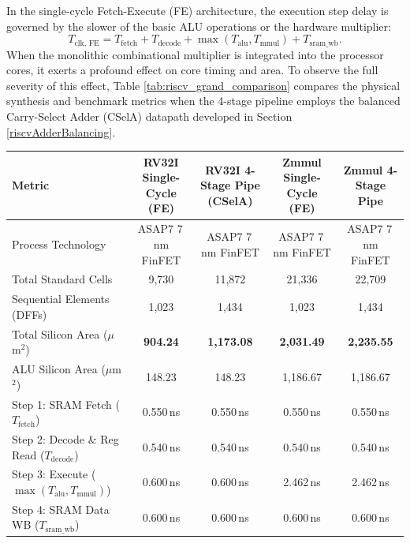 In the single-cycle Fetch-Execute (FE) architecture, the execution step delay is governed by the slower of the basic ALU operations or the hardware multiplier:
\begin{equation}
T_{\text{clk, FE}} = T_{\text{fetch}} + T_{\text{decode}} + \max(T_{\text{alu}}, T_{\text{mmul}}) + T_{\text{sram\_wb}}.
\end{equation}
When the monolithic combinational multiplier is integrated into the processor cores, it exerts a profound effect on core timing and area. To observe the full severity of this effect, Table \ref{tab:riscv_grand_comparison} compares the physical synthesis and benchmark metrics when the 4-stage pipeline employs the balanced Carry-Select Adder (CSelA) datapath developed in Section \ref{riscvAdderBalancing}.

\begin{table}[htbp]
\centering
\scriptsize
\begin{tabular}{|l|c|c|c|c|}
\hline
\textbf{Metric} & \textbf{RV32I Single-Cycle (FE)} & \textbf{RV32I 4-Stage Pipe (CSelA)} & \textbf{Zmmul Single-Cycle (FE)} & \textbf{Zmmul 4-Stage Pipe} \\
\hline
Process Technology              & ASAP7 7\,nm FinFET & ASAP7 7\,nm FinFET & ASAP7 7\,nm FinFET & ASAP7 7\,nm FinFET \\
Total Standard Cells            & 9,730            & 11,872           & 21,336           & 22,709 \\
Sequential Elements (DFFs)      & 1,023            & 1,434            & 1,023            & 1,434 \\
Total Silicon Area ($\mu$m$^2$) & \textbf{904.24}  & \textbf{1,173.08} & \textbf{2,031.49} & \textbf{2,235.55} \\
ALU Silicon Area ($\mu$m$^2$)   & 148.23           & 148.23           & 1,186.67         & 1,186.67 \\
\hline
Step 1: SRAM Fetch ($T_{\text{fetch}}$)         & 0.550\,ns          & 0.550\,ns         & 0.550\,ns          & 0.550\,ns \\
Step 2: Decode \& Reg Read ($T_{\text{decode}}$) & 0.540\,ns         & 0.540\,ns         & 0.540\,ns          & 0.540\,ns \\
Step 3: Execute ($\max(T_{\text{alu}}, T_{\text{mmul}})$) & 0.600\,ns & 0.600\,ns         & 2.462\,ns          & 2.462\,ns \\
Step 4: SRAM Data WB ($T_{\text{sram\_wb}}$)    & 0.600\,ns          & 0.600\,ns         & 0.600\,ns          & 0.600\,ns \\

\end{tabular}
\end{table}
